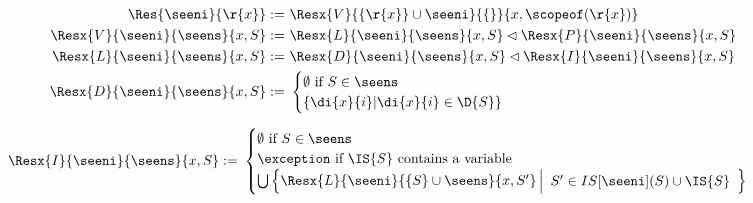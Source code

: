 
\begin{figure*}[t]
\begin{boxedminipage}{\hsize}
\small
  \begin{minipage}{.4\linewidth}
    \begin{align*}
      \Res{\seeni}{\r{x}} :=&\ \Resx{V}{\{\r{x}\} \cup \seeni}{\{\}}{{x},\scopeof(\r{x})} \\
      \Resx{V}{\seeni}{\seens}{x,S}
      := & \ \Resx{L}{\seeni}{\seens}{{x},S} \lhd \Resx{P}{\seeni}{\seens}{{x},S}  \\  
      \Resx{L}{\seeni}{\seens}{{x},S} 
      :=&\ \Resx{D}{\seeni}{\seens}{{x},S} \lhd \Resx{I}{\seeni}{\seens}{{x},S} \\
      \Resx{D}{\seeni}{\seens}{{x},S}
      :=&\ \begin{cases}
        \emptyset \mbox{ if } S \in \seens \\
        \{ \di{x}{i} | \di{x}{i} \in \D{S} \}
      \end{cases} \\
    \end{align*}
  \end{minipage}
  \begin{minipage}{.6\linewidth}
  \begin{align*}
    \Resx{I}{\seeni}{\seens}{{x},S}
    :=&\ \begin{cases}
      \emptyset \mbox{ if } S \in \seens \\
      \exception \mbox{ if $\IS{S}$ contains a variable} \\
      \bigcup 
      \left\{ 
        \Resx{L}{\seeni}{\{S\} \cup \seens}{{x},S'}
        \left| 
          \begin{array}{ll}
            S' \in IS[\seeni](S) \cup \IS{S}
          \end{array}
        \right\} \right.

\end{cases}
\end{align*}
\end{minipage}
\end{boxedminipage}
\end{figure*}
